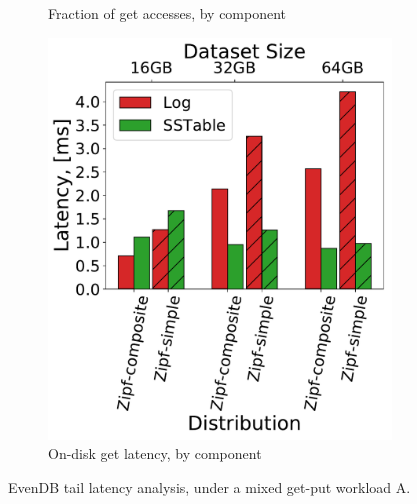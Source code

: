 \documentclass[sigplan,10pt]{acmart}
\newcommand{\sys}{EvenDB}
\begin{document}
{{\begin{figure}[tb]
\begin{subfigure}{0.32\linewidth}
\caption{Fraction of get accesses, by component}
\label{fig:tail_latency:dist}
\end{subfigure}
\begin{subfigure}{0.31\linewidth}
\includegraphics[width=\textwidth]{figs/Latency_A.pdf}
\caption{On-disk get latency, by component}
\label{fig:tail_latency:disk}
\end{subfigure}
\label{fig:tail_latency}
\caption{{\sys\/ tail latency analysis, under a mixed get-put workload A.}}
\end{figure}
}
}
\end{document}
